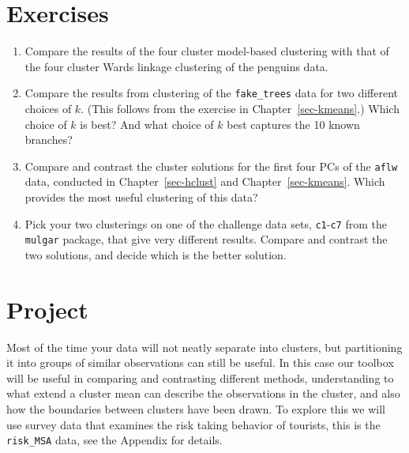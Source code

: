 \documentclass[
  letterpaper,
]{krantz}
\providecommand{\tightlist}{%
  \setlength{\itemsep}{0pt}\setlength{\parskip}{0pt}}\usepackage{longtable,booktabs,array}
\begin{document}
\section*{Exercises}\label{exercises-11}


\begin{enumerate}
\def\labelenumi{\arabic{enumi}.}
\tightlist
\item
  Compare the results of the four cluster model-based clustering with
  that of the four cluster Wards linkage clustering of the penguins
  data.
\item
  Compare the results from clustering of the \texttt{fake\_trees} data
  for two different choices of \(k\). (This follows from the exercise in
  Chapter~\ref{sec-kmeans}.) Which choice of \(k\) is best? And what
  choice of \(k\) best captures the 10 known branches?
\item
  Compare and contrast the cluster solutions for the first four PCs of
  the \texttt{aflw} data, conducted in Chapter~\ref{sec-hclust} and
  Chapter~\ref{sec-kmeans}. Which provides the most useful clustering of
  this data?
\item
  Pick your two clusterings on one of the challenge data sets,
  \texttt{c1}-\texttt{c7} from the \texttt{mulgar} package, that give
  very different results. Compare and contrast the two solutions, and
  decide which is the better solution.
\end{enumerate}

\section*{Project}\label{project-3}


Most of the time your data will not neatly separate into clusters, but
partitioning it into groups of similar observations can still be useful.
In this case our toolbox will be useful in comparing and contrasting
different methods, understanding to what extend a cluster mean can
describe the observations in the cluster, and also how the boundaries
between clusters have been drawn. To explore this we will use survey
data that examines the risk taking behavior of tourists, this is the
\texttt{risk\_MSA} data, see the Appendix for details.
\end{document}
